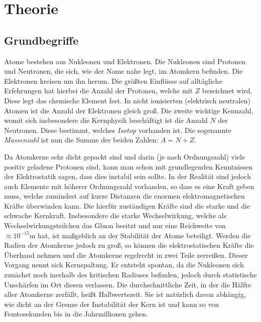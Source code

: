 \documentclass[12pt,a4paper,titlepage,headinclude,bibtotoc]{scrartcl}
\begin{document}
\section{Theorie}
\label{sec:theorie}
\subsection{Grundbegriffe}
Atome bestehen aus Nukleonen und Elektronen.
Die Nukleonen sind Protonen und Neutronen, die sich, wie der Name nahe legt, im Atomkern befinden.
Die Elektronen kreisen um ihn herum.
Die größten Einflüsse auf alltägliche Erfehrungen hat hierbei die Anzahl der Protonen, welche mit $Z$ bezeichnet wird.
Diese legt das chemische Element fest.
In nicht ionisierten (elektrisch neutralen) Atomen ist die Anzahl der Elektronen gleich groß.
Die zweite wichtige Kennzahl, womit sich insbesondere die Kernphysik beschäftigt ist die Anzahl $N$ der Neutronen.
Diese bestimmt, welches \textit{Isotop} vorhanden ist.
Die sogenannte \textit{Massenzahl} ist nun die Summe der beiden Zahlen: $A=N+Z$.

Da Atomkerne sehr dicht gepackt sind und darin (je nach Ordnungszahl) viele positiv geladene Protonen sind, kann man schon mit grundlegenden Kenntnissen der Elektrostatik sagen, dass dies instabil sein sollte.
In der Realität sind jedoch auch Elemente mit höherer Ordnungszahl vorhanden, so dass es eine Kraft geben muss, welche zumindest auf kurze Distanzen die enormen elektromagnetischen Kräfte überwinden kann.
Die hierfür zuständigen Kräfte sind die starke und die schwache Kernkraft.
Insbesondere die starke Wechselwirkung, welche als Wechselwirkungsteilchen das Gluon besitzt und nur eine Reichweite von $\approx10^{-15}\si\metre$ hat, ist maßgeblich an der Stabilität der Atome beteiligt.
Werden die Radien der Atomkerne jedoch zu groß, so können die elektrostatischen Kräfte die Überhand nehmen und die Atomkerne regelrecht in zwei Teile zerreißen.
Dieser Vorgang nennt sich Kernspaltung.
Er entsteht spontan, da die Nukleonen sich zunächst noch inerhalb des kritischen Radiuses befinden, jedoch durch statistische Unschärfen im Ort diesen verlassen.
Die durchschnittliche Zeit, in der die Hälfte aller Atomkerne zerfällt, heißt Halbwertszeit.
Sie ist natürlich davon abhängig, wie dicht an der Grenze der Instabilität der Kern ist und kann so von Femtosekunden bis in die Jahrmillionen gehen.
\end{document}
